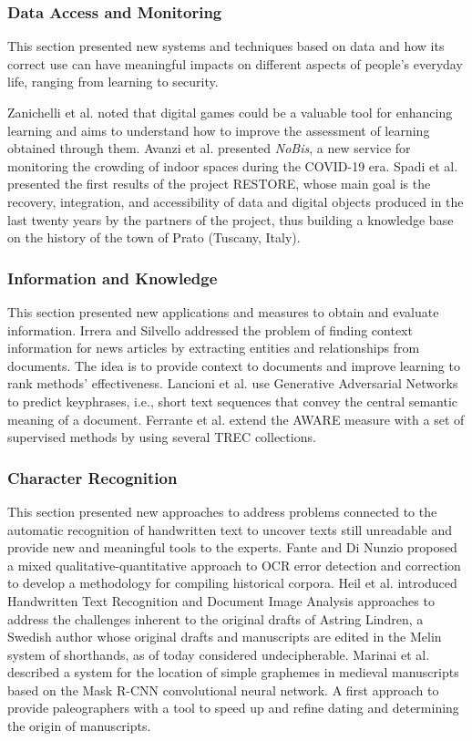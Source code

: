 \documentclass{sig-alternate-10pt}
\begin{document}
\subsubsection*{Data Access and Monitoring}
This section presented new systems and techniques based on data and how its correct use can have meaningful impacts on different aspects of people's everyday life, ranging from learning to security.

Zanichelli et al. \cite{ZanichelliETTC21} noted that digital games could be a valuable tool for enhancing learning and aims to understand how to improve the assessment of learning obtained through them.
Avanzi et al. \cite{AvanziCCG021} presented \emph{NoBis}, a new service for monitoring the crowding of indoor spaces during the COVID-19 era.
Spadi et al. \cite{SpadiSD21} presented the first results of the project RESTORE, whose main goal is the recovery, integration, and accessibility of data and digital objects produced in the last twenty years by the partners of the project, thus building a knowledge base on the history of the town of Prato (Tuscany, Italy).


\subsubsection*{Information and Knowledge}
This section presented new applications and measures to obtain and evaluate information. 
Irrera and Silvello \cite{IrreraS21} addressed the problem of finding context information for news articles by extracting entities and relationships from documents. The idea is to provide context to documents and improve learning to rank methods' effectiveness.
Lancioni et al. \cite{LancioniMP0T21} use Generative Adversarial Networks to predict keyphrases, i.e., short text sequences that convey the central semantic meaning of a document. 
Ferrante et al. \cite{Ferrante0P21} extend the AWARE measure with a set of supervised methods by using several TREC collections. 

\subsubsection*{Character Recognition}
This section presented new approaches to address problems connected to the automatic recognition of handwritten text to uncover texts still unreadable and provide new and meaningful tools to the experts.
Fante and Di Nunzio \cite{FanteN21} proposed a mixed qualitative-quantitative approach to OCR error detection and correction to develop a methodology for compiling historical corpora. 
Heil et al. \cite{HeilNH21} introduced Handwritten Text Recognition and Document Image Analysis approaches to address the challenges inherent to the original drafts of Astring Lindren, a Swedish author whose original drafts and manuscripts are edited in the Melin system of shorthands, as of today considered undecipherable.
Marinai et al. \cite{MarinaiPRS21} described a system for the location of simple graphemes in medieval manuscripts based on the Mask R-CNN convolutional neural network. A first approach to provide paleographers with a tool to speed up and refine dating and determining the origin of manuscripts.
\end{document}
